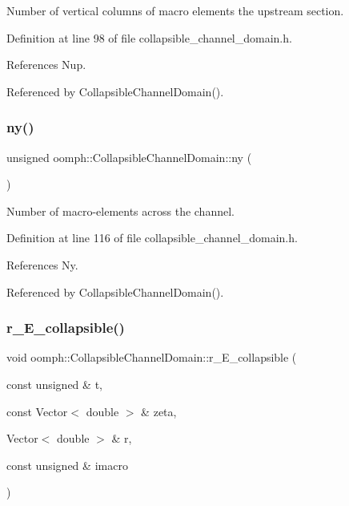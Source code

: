 Number of vertical columns of macro elements the upstream section. 



Definition at line 98 of file collapsible\+\_\+channel\+\_\+domain.\+h.



References Nup.



Referenced by Collapsible\+Channel\+Domain().

\mbox{\label{classoomph_1_1CollapsibleChannelDomain_a62e15782984f3d5e10ba44a6d8ad06ee}} 
\subsubsection{\texorpdfstring{ny()}{ny()}}
{\footnotesize\ttfamily unsigned oomph\+::\+Collapsible\+Channel\+Domain\+::ny (\begin{DoxyParamCaption}{ }\end{DoxyParamCaption})\hspace{0.3cm}{\ttfamily [inline]}}



Number of macro-\/elements across the channel. 



Definition at line 116 of file collapsible\+\_\+channel\+\_\+domain.\+h.



References Ny.



Referenced by Collapsible\+Channel\+Domain().

\mbox{\label{classoomph_1_1CollapsibleChannelDomain_af684e8e3271ed8f599a02495f794c4e8}} 
\subsubsection{\texorpdfstring{r\+\_\+\+E\+\_\+collapsible()}{r\_E\_collapsible()}}
{\footnotesize\ttfamily void oomph\+::\+Collapsible\+Channel\+Domain\+::r\+\_\+\+E\+\_\+collapsible (\begin{DoxyParamCaption}\item[{const unsigned \&}]{t,  }\item[{const Vector$<$ double $>$ \&}]{zeta,  }\item[{Vector$<$ double $>$ \&}]{r,  }\item[{const unsigned \&}]{imacro }\end{DoxyParamCaption})\hspace{0.3cm}{\ttfamily [private]}}




